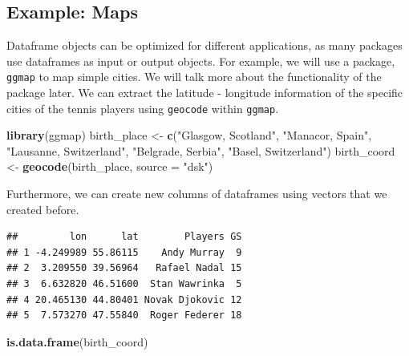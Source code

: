 \documentclass[12pt,]{krantz}
\newenvironment{Shaded}{\begin{snugshade}}{\end{snugshade}}
\newcommand{\KeywordTok}[1]{\textcolor[rgb]{0.27,0.27,0.27}{\textbf{#1}}}
\newcommand{\DataTypeTok}[1]{\textcolor[rgb]{0.27,0.27,0.27}{#1}}
\newcommand{\StringTok}[1]{\textcolor[rgb]{0.5,0.5,0.5}{#1}}
\newcommand{\OperatorTok}[1]{\textcolor[rgb]{0.43,0.43,0.43}{\textbf{#1}}}
\newcommand{\NormalTok}[1]{#1}
\begin{document}
\subsection{Example: Maps}\label{example-maps}

Dataframe objects can be optimized for different applications, as many
packages use dataframes as input or output objects. For example, we will
use a package, \texttt{ggmap} to map simple cities. We will talk more
about the functionality of the package later. We can extract the
latitude - longitude information of the specific cities of the tennis
players using \texttt{geocode} within \texttt{ggmap}.

\begin{Shaded}
\begin{Highlighting}[]
\KeywordTok{library}\NormalTok{(ggmap)}
\NormalTok{birth_place <-}\StringTok{ }\KeywordTok{c}\NormalTok{(}\StringTok{"Glasgow, Scotland"}\NormalTok{, }\StringTok{"Manacor, Spain"}\NormalTok{, }\StringTok{"Lausanne, Switzerland"}\NormalTok{,}
                \StringTok{"Belgrade, Serbia"}\NormalTok{, }\StringTok{"Basel, Switzerland"}\NormalTok{)}
\NormalTok{birth_coord <-}\StringTok{ }\KeywordTok{geocode}\NormalTok{(birth_place, }\DataTypeTok{source =} \StringTok{"dsk"}\NormalTok{)}
\end{Highlighting}
\end{Shaded}

Furthermore, we can create new columns of dataframes using vectors that
we created before.

\begin{Shaded}
\end{Shaded}

\begin{verbatim}
##         lon      lat        Players GS
## 1 -4.249989 55.86115    Andy Murray  9
## 2  3.209550 39.56964   Rafael Nadal 15
## 3  6.632820 46.51600  Stan Wawrinka  5
## 4 20.465130 44.80401 Novak Djokovic 12
## 5  7.573270 47.55840  Roger Federer 18
\end{verbatim}

\begin{Shaded}
\begin{Highlighting}[]
\KeywordTok{is.data.frame}\NormalTok{(birth_coord)}
\end{Highlighting}
\end{Shaded}
\end{document}
